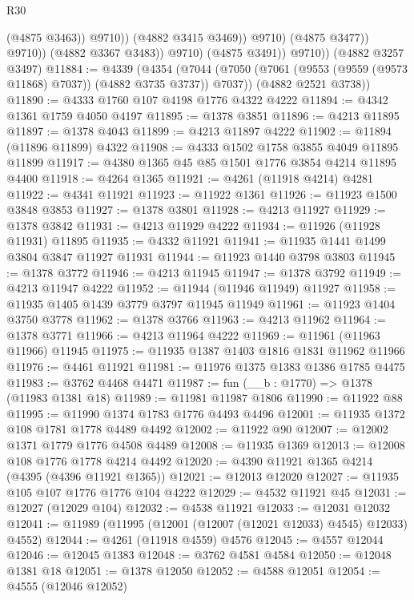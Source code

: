 \begin{lexlean}{R30}
\begin{coremodule}
                              (@4875 @3463))
                            @9710))
                        (@4882 @3415 @3469))
                      @9710)
                    (@4875 @3477))
                  @9710))
              (@4882 @3367 @3483))
            @9710)
          (@4875 @3491))
        @9710))
    (@4882 @3257 @3497)
@11884 := @4339
    (@4354
      (@7044 (@7050 (@7061 (@9553 (@9559 (@9573 @11868) @7037)) (@4882 @3735 @3737)) @7037))
      (@4882 @2521 @3738))
@11890 := @4333 @1760 @107 @4198 @1776 @4322 @4222
@11894 := @4342 @1361 @1759 @4050 @4197
@11895 := @1378 @3851
@11896 := @4213 @11895
@11897 := @1378 @4043
@11899 := @4213 @11897 @4222
@11902 := @11894 (@11896 @11899) @4322
@11908 := @4333 @1502 @1758 @3855 @4049 @11895 @11899
@11917 := @4380 @1365 @45 @85 @1501 @1776 @3854 @4214 @11895 @4400
@11918 := @4264 @1365
@11921 := @4261 (@11918 @4214) @4281
@11922 := @4341 @11921
@11923 := @11922 @1361
@11926 := @11923 @1500 @3848 @3853
@11927 := @1378 @3801
@11928 := @4213 @11927
@11929 := @1378 @3842
@11931 := @4213 @11929 @4222
@11934 := @11926 (@11928 @11931) @11895
@11935 := @4332 @11921
@11941 := @11935 @1441 @1499 @3804 @3847 @11927 @11931
@11944 := @11923 @1440 @3798 @3803
@11945 := @1378 @3772
@11946 := @4213 @11945
@11947 := @1378 @3792
@11949 := @4213 @11947 @4222
@11952 := @11944 (@11946 @11949) @11927
@11958 := @11935 @1405 @1439 @3779 @3797 @11945 @11949
@11961 := @11923 @1404 @3750 @3778
@11962 := @1378 @3766
@11963 := @4213 @11962
@11964 := @1378 @3771
@11966 := @4213 @11964 @4222
@11969 := @11961 (@11963 @11966) @11945
@11975 := @11935 @1387 @1403 @1816 @1831 @11962 @11966
@11976 := @4461 @11921
@11981 := @11976 @1375 @1383 @1386 @1785 @4475
@11983 := @3762 @4468 @4471
@11987 := fun (__b : @1770) => @1378 (@11983 @1381 @18)
@11989 := @11981 @11987 @1806
@11990 := @11922 @88
@11995 := @11990 @1374 @1783 @1776 @4493 @4496
@12001 := @11935 @1372 @108 @1781 @1778 @4489 @4492
@12002 := @11922 @90
@12007 := @12002 @1371 @1779 @1776 @4508 @4489
@12008 := @11935 @1369
@12013 := @12008 @108 @1776 @1778 @4214 @4492
@12020 := @4390 @11921 @1365 @4214 (@4395 (@4396 @11921 @1365))
@12021 := @12013 @12020
@12027 := @11935 @105 @107 @1776 @1776 @104 @4222
@12029 := @4532 @11921 @45
@12031 := @12027 (@12029 @104)
@12032 := @4538 @11921
@12033 := @12031 @12032
@12041 := @11989 (@11995 (@12001 (@12007 (@12021 @12033) @4545) @12033) @4552)
@12044 := @4261 (@11918 @4559) @4576
@12045 := @4557 @12044
@12046 := @12045 @1383
@12048 := @3762 @4581 @4584
@12050 := @12048 @1381 @18
@12051 := @1378 @12050
@12052 := @4588 @12051
@12054 := @4555 (@12046 @12052)

\end{coremodule}
\end{lexlean}
